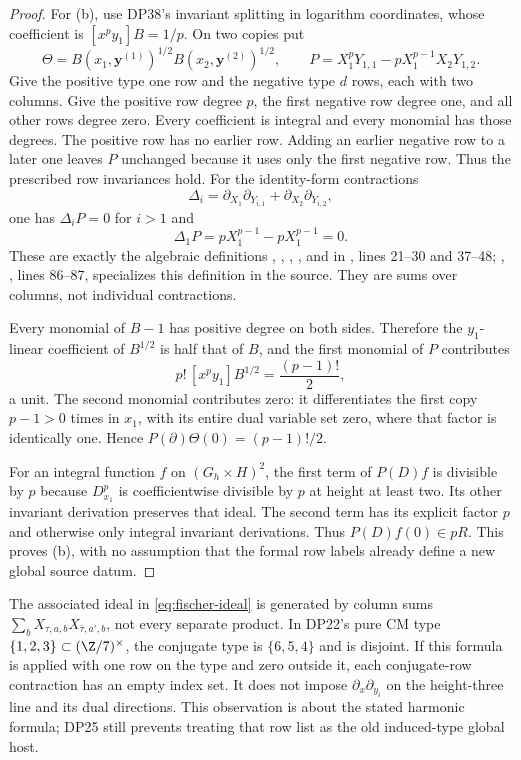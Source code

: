 \begin{proof}
For (b), use DP38's invariant splitting in logarithm coordinates, whose coefficient is $[x^py_1]B=1/p$. On two copies put
\[
 \Theta=B(x_1,\mathbf y^{(1)})^{1/2}B(x_2,\mathbf y^{(2)})^{1/2},\qquad
 P=X_1^pY_{1,1}-pX_1^{p-1}X_2Y_{1,2}.
\]
Give the positive type one row and the negative type $d$ rows, each with two columns. Give the positive row degree $p$, the first negative row degree one, and all other rows degree zero. Every coefficient is integral and every monomial has those degrees. The positive row has no earlier row. Adding an earlier negative row to a later one leaves $P$ unchanged because it uses only the first negative row. Thus the prescribed row invariances hold. For the identity-form contractions
\[
 \Delta_i=\partial_{X_1}\partial_{Y_{i,1}}+
          \partial_{X_2}\partial_{Y_{i,2}},
\]
one has $\Delta_iP=0$ for $i>1$ and
\[
 \Delta_1P=pX_1^{p-1}-pX_1^{p-1}=0.
\]
These are exactly the algebraic definitions , , , , and  in
,
lines 21--30 and 37--48; , , lines 86--87, specializes this definition in the source. They are sums over columns, not individual contractions.

Every monomial of $B-1$ has positive degree on both sides. Therefore the $y_1$-linear coefficient of $B^{1/2}$ is half that of $B$, and the first monomial of $P$ contributes
\[
 p!\,[x^py_1]B^{1/2}=\frac{(p-1)!}{2},
\]
a unit. The second monomial contributes zero: it differentiates the first copy $p-1>0$ times in $x_1$, with its entire dual variable set zero, where that factor is identically one. Hence $P(\partial)\Theta(0)=(p-1)!/2$.

For an integral function $f$ on $(G_h\times H)^2$, the first term of $P(D)f$ is divisible by $p$ because $D_{x_1}^p$ is coefficientwise divisible by $p$ at height at least two. Its other invariant derivation preserves that ideal. The second term has its explicit factor $p$ and otherwise only integral invariant derivations. Thus $P(D)f(0)\in pR$. This proves (b), with no assumption that the formal row labels already define a new global source datum.
\end{proof}

The associated ideal in \eqref{eq:fischer-ideal} is generated by column sums $\sum_bX_{\tau,a,b}X_{\bar\tau,a',b}$, not every separate product. In DP22's pure CM type $\{1,2,3\}\subset(\Z/7)^\times$, the conjugate type is $\{6,5,4\}$ and is disjoint. If this formula is applied with one row on the type and zero outside it, each conjugate-row contraction has an empty index set. It does not impose $\partial_x\partial_{y_i}$ on the height-three line and its dual directions. This observation is about the stated harmonic formula; DP25 still prevents treating that row list as the old induced-type global host.

